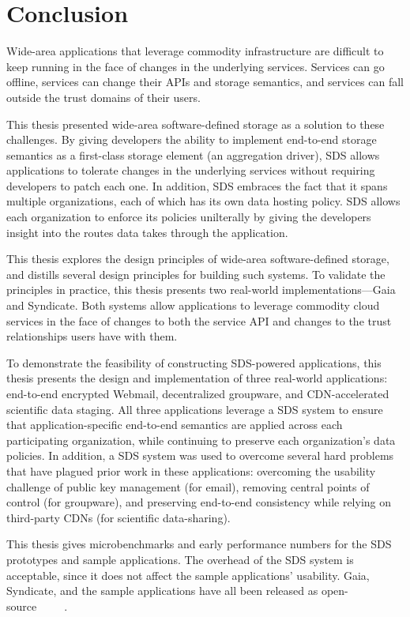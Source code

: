 \chapter{Conclusion}
\label{chap:conclusion}

Wide-area applications that leverage commodity infrastructure are difficult to
keep running in the face of changes in the underlying services.  Services can go
offline, services can change their APIs and storage semantics, and services can
fall outside the trust domains of their users.

This thesis presented wide-area software-defined storage as a solution to these
challenges.  By giving developers the ability to implement end-to-end
storage semantics as a first-class
storage element (an aggregation driver),
SDS allows applications to tolerate changes in the underlying
services without requiring developers to patch each one.
In addition, SDS embraces the fact that it spans multiple organizations, each of
which has its own data hosting policy.  SDS allows each organization to enforce
its policies unilterally by giving the developers insight into the routes data
takes through the application.

This thesis explores the design principles of wide-area software-defined storage, and
distills several design principles for building such systems.  To validate the
principles in practice, this thesis presents two real-world
implementations---Gaia and Syndicate.  Both systems allow applications to
leverage commodity cloud services in the face of changes to both the service API
and changes to the trust relationships users have with them.

To demonstrate the feasibility of constructing SDS-powered applications, 
this thesis presents the design and implementation of three real-world applications:
end-to-end encrypted Webmail, decentralized groupware, and CDN-accelerated
scientific data staging.  All three applications leverage a SDS system to ensure
that application-specific end-to-end semantics are applied across each
participating organization, while continuing to preserve each organization's
data policies.  In addition, a SDS system was used to overcome several hard
problems that have plagued prior work in these applications:
overcoming the usability challenge of public key management (for email),
removing central points of control (for groupware), and preserving end-to-end
consistency while relying on third-party CDNs (for scientific data-sharing).

This thesis gives microbenchmarks and early performance numbers for the SDS prototypes and
sample applications.  The overhead of the SDS system is acceptable,
since it does not affect the sample applications' usability.
Gaia, Syndicate, and the sample applications have all been released as
open-source~\cite{blockstack-core}~\cite{syndicate-storage}~\cite{syndicatemail}~\cite{blockstack-todo}~\cite{blockstack-browser}.

